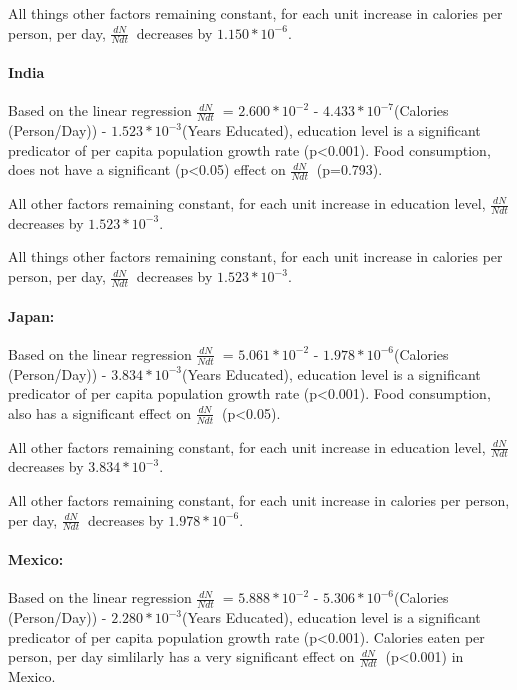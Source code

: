 \documentclass[]{article}
\let\oldparagraph\paragraph
\renewcommand{\paragraph}[1]{\oldparagraph{#1}\mbox{}}
\begin{document}
All things other factors remaining constant, for each unit increase in
calories per person, per day, \(\frac{dN}{Ndt}\ \) decreases by
\(1.150*10^{-6}\).

\paragraph{India}\label{india-1}

Based on the linear regression \(\frac{dN}{Ndt}\ \) = \(2.600*10^{-2}\)
- \(4.433*10^{-7}\)(Calories (Person/Day)) - \(1.523*10^{-3}\)(Years
Educated), education level is a significant predicator of per capita
population growth rate (p\textless{}0.001). Food consumption, does not
have a significant (p\textless{}0.05) effect on \(\frac{dN}{Ndt}\ \)
(p=0.793).

All other factors remaining constant, for each unit increase in
education level, \(\frac{dN}{Ndt}\ \) decreases by \(1.523*10^{-3}\).

All things other factors remaining constant, for each unit increase in
calories per person, per day, \(\frac{dN}{Ndt}\ \) decreases by
\(1.523*10^{-3}\).

\paragraph{Japan:}\label{japan}

Based on the linear regression \(\frac{dN}{Ndt}\ \) = \(5.061*10^{-2}\)
- \(1.978*10^{-6}\)(Calories (Person/Day)) - \(3.834*10^{-3}\)(Years
Educated), education level is a significant predicator of per capita
population growth rate (p\textless{}0.001). Food consumption, also has a
significant effect on \(\frac{dN}{Ndt}\ \) (p\textless{}0.05).

All other factors remaining constant, for each unit increase in
education level, \(\frac{dN}{Ndt}\ \) decreases by \(3.834*10^{-3}\).

All other factors remaining constant, for each unit increase in calories
per person, per day, \(\frac{dN}{Ndt}\ \) decreases by
\(1.978*10^{-6}\).

\paragraph{Mexico:}\label{mexico}

Based on the linear regression \(\frac{dN}{Ndt}\ \) = \(5.888*10^{-2}\)
- \(5.306*10^{-6}\)(Calories (Person/Day)) - \(2.280*10^{-3}\)(Years
Educated), education level is a significant predicator of per capita
population growth rate (p\textless{}0.001). Calories eaten per person,
per day simlilarly has a very significant effect on \(\frac{dN}{Ndt}\ \)
(p\textless{}0.001) in Mexico.
\end{document}
